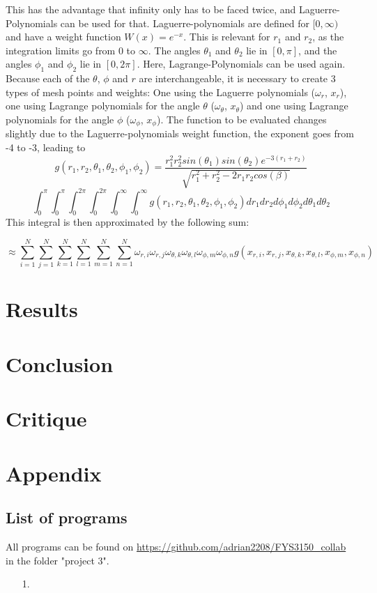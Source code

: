 \documentclass[10pt,a4paper]{article}
\begin{document}
This has the advantage that infinity only has to be faced twice, and Laguerre-Polynomials can be used for that. Laguerre-polynomials are defined for $[0,\infty)$ and have a weight function $W(x)=e^{-x}$. This is relevant for $r_1$ and $r_2$, as the integration limits go from $0$ to $\infty$. The angles $\theta_1$ and $\theta_2$ lie in $[0,\pi]$, and the angles $\phi_1$ and $\phi_2$  lie in $[0,2\pi]$. Here, Lagrange-Polynomials can be used again. Because each of the $\theta$, $\phi$ and $r$ are interchangeable, it is necessary to create 3 types of mesh points and weights: One using the Laguerre polynomials  ($\omega_r$, $x_r$), one using Lagrange polynomials for the angle $\theta$ ($\omega_\theta$, $x_\theta$) and one using Lagrange polynomials for the angle $\phi$ ($\omega_\phi$, $x_\phi$). The function to be evaluated changes slightly due to the Laguerre-polynomials weight function, the exponent goes from -4 to -3, leading to
$$g(r_1,r_2,\theta_1,\theta_2,\phi_1,\phi_2)=\frac{r_1^2r_2^2sin(\theta_1)sin(\theta_2)e^{-3(r_1+r_2)}}{\sqrt{r_1^2+r_2^2-2r_1r_2cos(\beta)}}$$
$$\int_{0}^{\pi}\int_{0}^{\pi}\int_{0}^{2\pi}\int_{0}^{2\pi}\int_{0}^{\infty}\int_{0}^{\infty}
g(r_1,r_2,\theta_1,\theta_2,\phi_1,\phi_2)dr_1dr_2d\phi_1d\phi_2d\theta_1d\theta_2$$
This integral is then approximated by the following sum:

$$
\approx \sum_{i=1}^N \sum_{j=1}^N \sum_{k=1}^N \sum_{l=1}^N \sum_{m=1}^N \sum_{n=1}^N \omega_{r,i} \omega_{r,j} \omega_{\theta ,k} \omega_{\theta ,l} \omega_{\phi ,m} \omega_{\phi ,n} g(x_{r,i},x_{r,j},x_{\theta ,k},x_{\theta ,l},x_{\phi ,m},x_{\phi ,n})
$$

\section{Results}

\section{Conclusion}

\section{Critique}

\section{Appendix}


\subsection{List of programs}
All programs can be found on \url{https://github.com/adrian2208/FYS3150_collab} in the folder "project 3".
\begin{itemize}
\item[1.] 
\end{itemize}
\end{document}
